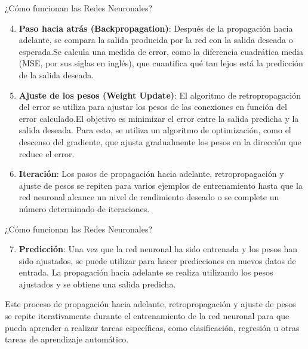 \documentclass[11pt,aspectratio=169]{beamer}
\begin{document}
\begin{frame}{¿Cómo funcionan las Redes Neuronales?}
	\begin{enumerate}
		\setcounter{enumi}{3}
		\item \textbf{Paso hacia atrás (Backpropagation)}: Después de la propagación hacia adelante, se compara la salida producida por la red 
			con la salida deseada o esperada.\pause Se calcula una medida de error, como la diferencia cuadrática media (MSE, por sus siglas en inglés),
			que cuantifica qué tan lejos está la predicción de la salida deseada.\pause
		\item \textbf{Ajuste de los pesos (Weight Update)}: El algoritmo de retropropagación del error se utiliza para ajustar los pesos de las 
			conexiones en función del error calculado.\pause El objetivo es minimizar el error entre la salida predicha y la salida deseada. 
			\pause Para esto, se utiliza un algoritmo de optimización, como el descenso del gradiente, que ajusta gradualmente los pesos en la 
			dirección que reduce el error.\pause
		\item \textbf{Iteración}: Los pasos de propagación hacia adelante, retropropagación y ajuste de pesos se repiten para varios ejemplos 
			de entrenamiento hasta que la red neuronal alcance un nivel de rendimiento deseado o se complete un número determinado de iteraciones.
	\end{enumerate}
\end{frame}

\begin{frame}{¿Cómo funcionan las Redes Neuronales?}
	\begin{enumerate}
		\setcounter{enumi}{6}
		\item \textbf{Predicción}: Una vez que la red neuronal ha sido entrenada y los pesos han sido ajustados, se puede utilizar para hacer 
			predicciones en nuevos datos de entrada. La propagación hacia adelante se realiza utilizando los pesos ajustados y se obtiene 
			una salida predicha.\pause
	\end{enumerate}
	Este proceso de propagación hacia adelante, retropropagación y ajuste de pesos se repite iterativamente durante el entrenamiento de la red 
	neuronal para que pueda aprender a realizar tareas específicas, como clasificación, regresión u otras tareas de aprendizaje automático.
\end{frame}
\end{document}
